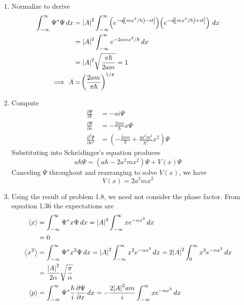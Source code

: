 \documentclass[a4paper]{article}
\begin{document}
\begin{enumerate}[label=(\alph*)]
	\item Normalize to derive
	\begin{align*}
		\int^{\infty}_{-\infty} \Psi^{*}\Psi \, dx & = \abs{A}^{2}\int^{\infty}_{-\infty} \!\left( e^{-a \!\left[ \!\left( mx^{2} / \hbar \right) - it \right]} \right)\!\left( e^{-a \!\left[ \!\left( mx^{2} / \hbar \right) + it \right]} \right) \, dx \\
							   & =  \abs{A}^{2}\int^{\infty}_{-\infty} e^{-2amx^{2} / \hbar} \, dx \\
							   & = \abs{A}^{2}\sqrt{\frac{\pi \hbar}{2am}} = 1 \\
							\implies A & = \!\left( \frac{2am}{\pi \hbar} \right)^{1/4}
	\end{align*}
	\item Compute
	\begin{align*}
		\frac{\partial \Psi}{\partial t} & = -ai \Psi \\
		\frac{\partial \Psi}{\partial x} & = -\frac{2am}{\hbar}x \Psi \\ 
		\frac{\partial^2 \Psi}{\partial x^2} & = \!\left( -\frac{2am}{\hbar} + \frac{4a^{2}m^{2}}{\hbar^{2}}x^{2} \right)\Psi
	\end{align*}
	Substituting into Schr\"odinger's equation produces
	\[
		a \hbar \Psi = \!\left( a \hbar - 2a^{2}m x^{2} \right)\Psi + V \!\left( x \right) \Psi 
	\]
	Canceling \( \Psi \) throughout and rearranging to solve \( V \!\left( x \right) \), we have
	\[
		V \!\left( x \right) = 2a^{2}mx^{2} 
	\]
	\item Using the result of problem 1.8, we need not consider the phase factor. From equation 1.36 the expectations are
	\begin{align*}
		\braket{x} & = \int^{\infty}_{-\infty} \Psi^{*}x \Psi \, dx = \abs{A}^{2}\int^{\infty}_{-\infty} xe^{-\alpha x^{2}} \, dx \\
			   & = 0 \\
		\braket{x^{2}} & = \int^{\infty}_{-\infty} \Psi^{*}x^{2}\Psi \, dx = \abs{A}^{2}\int^{\infty}_{-\infty} x^{2}e^{-\alpha x^{2}} \, dx = 2 \abs{A}^{2}\int^{\infty}_{0} x^{2}e^{-\alpha x^{2}} \, dx \\
			       & = \frac{\abs{A}^{2}}{2 \alpha}\sqrt{\frac{\pi}{\alpha}} \\
		\braket{p} & = \int^{\infty}_{-\infty} \Psi^{*}\frac{\hbar}{i}\frac{\partial \Psi}{\partial x} \, dx = -\frac{2 \abs{A}^{2}am}{i}\int^{\infty}_{-\infty} xe^{-\alpha x^{2}} \, dx \\

\end{align*}
\end{enumerate}
\end{document}
